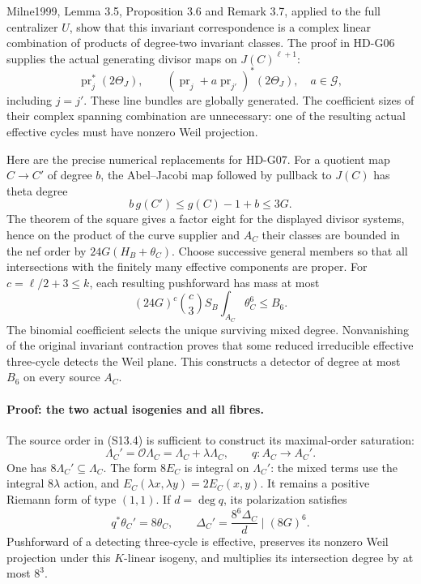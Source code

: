 Milne1999, Lemma 3.5, Proposition 3.6 and Remark 3.7, applied
to the full centralizer \(U\), show that this invariant
correspondence is a complex linear combination of products
of degree-two invariant classes. The proof in HD-G06 supplies
the actual generating divisor maps on \(J(C)^{\ell+1}\):
\[
 \operatorname{pr}_j^*(2\Theta_J),\qquad
 (\operatorname{pr}_j+a\operatorname{pr}_{j'})^*(2\Theta_J),
 \quad a\in\mathcal G,
\]
including \(j=j'\). These line bundles are globally generated.
The coefficient sizes of their complex spanning combination
are unnecessary: one of the resulting actual effective cycles
must have nonzero Weil projection.

Here are the precise numerical replacements for HD-G07.
For a quotient map \(C\to C'\) of degree \(b\), the
Abel--Jacobi map followed by pullback to \(J(C)\) has
theta degree
\[
 b\,g(C')\le g(C)-1+b\le3G.
\]
The theorem of the square gives a factor eight for the
displayed divisor systems, hence on the product of the curve
supplier and \(A_C\) their classes are bounded in the nef order
by \(24G(H_B+\theta_C)\).
Choose successive general members so that all intersections
with the finitely many effective components are proper.
For \(c=\ell/2+3\le k\), each resulting pushforward has mass
at most
\[
 (24G)^c\binom c3 S_B\int_{A_C}\theta_C^6
 \le B_6.
\]
The binomial coefficient selects the unique surviving mixed
degree. Nonvanishing of the original invariant contraction
proves that some reduced irreducible effective three-cycle
detects the Weil plane. This constructs a detector of degree
at most \(B_6\) on every source \(A_C\).

\paragraph{Proof: the two actual isogenies and all fibres.}
The source order in (S13.4) is sufficient to construct its
maximal-order saturation:
\[
 \Lambda_C'=\mathcal O\Lambda_C
           =\Lambda_C+\lambda\Lambda_C,\qquad
 q:A_C\longrightarrow A_C'.
\]
One has \(8\Lambda_C'\subseteq\Lambda_C\).
The form \(8E_C\) is integral on \(\Lambda_C'\):
the mixed terms use the integral \(8\lambda\) action, and
\(E_C(\lambda x,\lambda y)=2E_C(x,y)\).
It remains a positive Riemann form of type \((1,1)\).
If \(d=\deg q\), its polarization satisfies
\[
 q^*\theta_C'=8\theta_C,\qquad
 \Delta_C'=\frac{8^6\Delta_C}{d}\mid(8G)^6.                \tag{S14.5}
\]
Pushforward of a detecting three-cycle is effective, preserves
its nonzero Weil projection under this \(K\)-linear isogeny,
and multiplies its intersection degree by at most \(8^3\).

